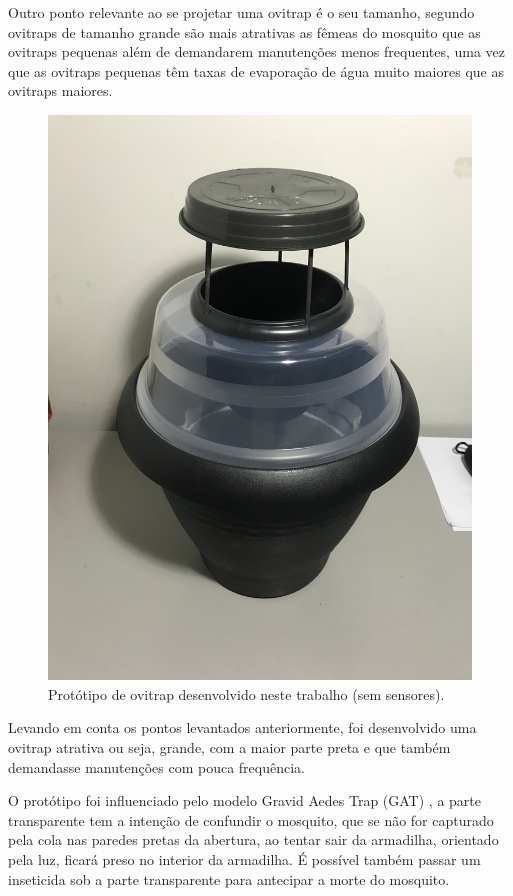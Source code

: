 \documentclass[
	12pt,				%
	openright,			%
	oneside,			%
	a4paper,			%
	chapter=TITLE,		%
	english,			%
	brazil				%
	]{abntex2}
\begin{document}
Outro ponto relevante ao se projetar uma ovitrap é o seu tamanho, segundo \cite{BRIANJJOHNSON2017} ovitraps de tamanho grande são 
mais atrativas as fêmeas do mosquito
 que as ovitraps pequenas além de demandarem manutenções menos frequentes, uma vez que as ovitraps pequenas têm taxas de evaporação 
 de água muito maiores que as ovitraps maiores.

\begin{figure}[H]
\centering
\includegraphics[scale=0.1, angle=-90]{imagens/prototipo1_2.jpg}
\caption{Protótipo de ovitrap desenvolvido neste trabalho (sem sensores).}
\end{figure}

Levando em conta os pontos levantados anteriormente, foi desenvolvido 
uma ovitrap atrativa ou seja, grande, com a maior parte preta e que também demandasse manutenções com pouca frequência.

O protótipo foi influenciado pelo modelo Gravid Aedes Trap (GAT) \cite{ALVARO2014}, a parte transparente tem a intenção de confundir 
o mosquito, que se não for capturado pela cola nas paredes pretas da abertura, ao tentar sair da armadilha, orientado pela luz,
ficará preso no interior da armadilha. É possível também passar um inseticida sob a parte transparente para antecipar
a morte do mosquito.
\end{document}
